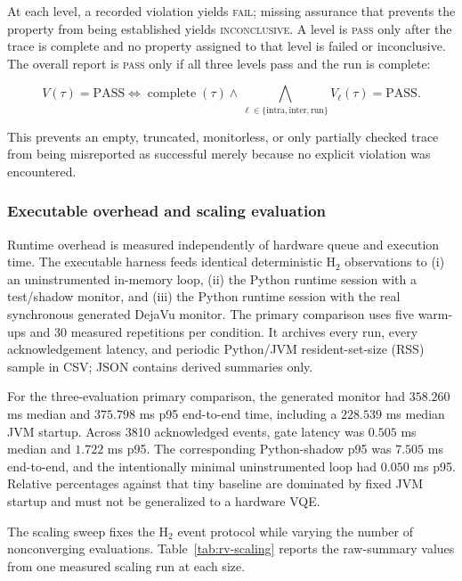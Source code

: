 At each level, a recorded violation yields \textsc{fail}; missing assurance
that prevents the property from being established yields
\textsc{inconclusive}.  A level is \textsc{pass} only after the trace is
complete and no property assigned to that level is failed or inconclusive.
The overall report is \textsc{pass} only if all three levels pass and the run
is complete:

\begin{equation}
  V(\tau)=\mathrm{PASS}
  \Longleftrightarrow
  \operatorname{complete}(\tau)
  \land\bigwedge_{\ell\in\{\mathrm{intra,inter,run}\}}
  V_{\ell}(\tau)=\mathrm{PASS}.
  \label{eq:rv-verdict}
\end{equation}

This prevents an empty, truncated, monitorless, or only partially checked trace
from being misreported as successful merely because no explicit violation was
encountered.

\subsubsection{Executable overhead and scaling evaluation}

Runtime overhead is measured independently of hardware queue and execution
time.  The executable harness feeds identical deterministic H$_2$ observations
to (i) an uninstrumented in-memory loop, (ii) the Python runtime session with a
test/shadow monitor, and (iii) the Python runtime session with the real
synchronous generated DejaVu monitor.  The primary comparison uses five
warm-ups and 30 measured repetitions per condition.  It archives every run,
every acknowledgement latency, and periodic Python/JVM resident-set-size (RSS)
sample in CSV; JSON contains derived summaries only.

For the three-evaluation primary comparison, the generated monitor had
$358.260$ ms median and $375.798$ ms p95 end-to-end time, including a
$228.539$ ms median JVM startup.  Across 3810 acknowledged events, gate latency
was $0.505$ ms median and $1.722$ ms p95.  The corresponding Python-shadow p95
was $7.505$ ms end-to-end, and the intentionally minimal uninstrumented loop
had $0.050$ ms p95.  Relative percentages against that tiny baseline are
dominated by fixed JVM startup and must not be generalized to a hardware VQE.

The scaling sweep fixes the H$_2$ event protocol while varying the number of
nonconverging evaluations.  Table~\ref{tab:rv-scaling} reports the raw-summary
values from one measured scaling run at each size.

